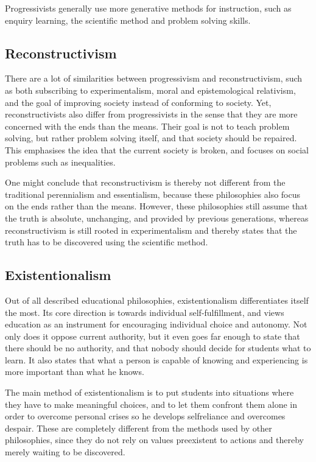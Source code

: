 Progressivists generally use more generative methods for instruction, such as enquiry learning, the scientific method and problem solving skills.

\subsection{Reconstructivism}

There are a lot of similarities between progressivism and reconstructivism, such as both subscribing to experimentalism, moral and epistemological relativism, and the goal of improving society instead of conforming to society. Yet, reconstructivists also differ from progressivists in the sense that they are more concerned with the ends than the means. Their goal is not to teach problem solving, but rather problem solving itself, and that society should be repaired. This emphasises the idea that the current society is broken, and focuses on social problems such as inequalities.

One might conclude that reconstructivism is thereby not different from the traditional perennialism and essentialism, because these philosophies also focus on the ends rather than the means. However, these philosophies still assume that the truth is absolute, unchanging, and provided by previous generations, whereas reconstructivism is still rooted in experimentalism and thereby states that the truth has to be discovered using the scientific method.

\subsection{Existentionalism}

Out of all described educational philosophies, existentionalism differentiates itself the most. Its core direction is towards individual self-fulfillment, and views education as an instrument for encouraging individual choice and autonomy. Not only does it oppose current authority, but it even goes far enough to state that there should be no authority, and that nobody should decide for students what to learn. It also states that what a person is capable of knowing and experiencing is more important than what he knows.

The main method of existentionalism is to put students into situations where they have to make meaningful choices, and to let them confront them alone in order to overcome personal crises so he develops selfreliance and overcomes despair. These are completely different from the methods used by other philosophies, since they do not rely on values preexistent to actions and thereby merely waiting to be discovered.

